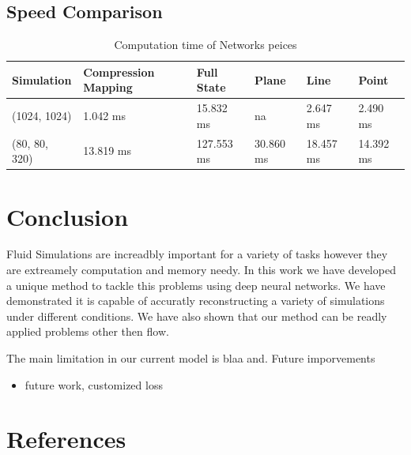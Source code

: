 \documentclass{article}
\begin{document}
\subsection{Speed Comparison}

\begin{table}[]
\caption{Computation time of Networks peices} \label{compute_times}
\centering
\begin{tabular}{|l|lllll|}
\hline
Simulation    & Compression Mapping & Full State  & Plane      & Line       & Point   \\ \hline
(1024, 1024)  & 1.042 ms            & 15.832 ms   & na         & 2.647 ms   & 2.490 ms \\ 
(80, 80, 320) & 13.819 ms           & 127.553 ms  & 30.860 ms  & 18.457 ms  & 14.392 ms \\ 
\hline
\end{tabular}
\end{table}

\section{Conclusion}

Fluid Simulations are increadbly important for a variety of tasks however they are extreamely computation and memory needy. In this work we have developed a unique method to tackle this problems using deep neural networks. We have demonstrated it is capable of accuratly reconstructing a variety of simulations under different conditions. We have also shown that our method can be readly applied problems other then flow.

The main limitation in our current model is blaa and. Future imporvements 

\begin{itemize}
  \item future work, customized loss
\end{itemize}

\section*{References}



\end{document}
